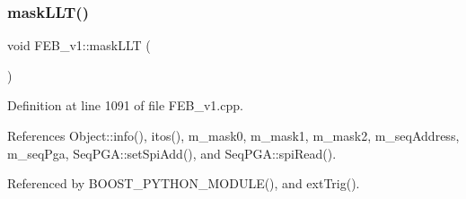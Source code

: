 \subsubsection{\texorpdfstring{mask\+L\+L\+T()}{maskLLT()}}
{\footnotesize\ttfamily void F\+E\+B\+\_\+v1\+::mask\+L\+LT (\begin{DoxyParamCaption}{ }\end{DoxyParamCaption})}



Definition at line 1091 of file F\+E\+B\+\_\+v1.\+cpp.



References Object\+::info(), itos(), m\+\_\+mask0, m\+\_\+mask1, m\+\_\+mask2, m\+\_\+seq\+Address, m\+\_\+seq\+Pga, Seq\+P\+G\+A\+::set\+Spi\+Add(), and Seq\+P\+G\+A\+::spi\+Read().



Referenced by B\+O\+O\+S\+T\+\_\+\+P\+Y\+T\+H\+O\+N\+\_\+\+M\+O\+D\+U\+L\+E(), and ext\+Trig().


